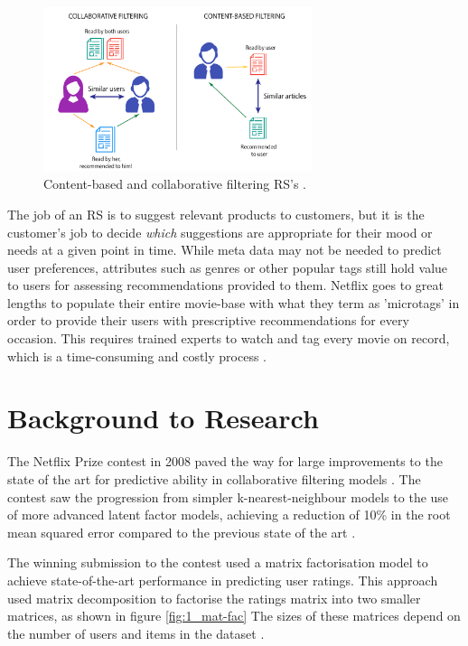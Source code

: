 \begin{figure}[H]
\centering
\includegraphics[width=0.7\textwidth]{Figures/1_content-based-vs-CF.png}
\decoRule
\caption[Types of recommender systems]{Content-based and collaborative filtering RS's \parencite{mohamed2019recommender}.}
\label{fig:1_content-cf}
\end{figure}

The job of an RS is to suggest relevant products to customers, but it is the customer's job to decide \textit{which} suggestions are appropriate for their mood or needs at a given point in time. While meta data may not be needed to predict user preferences, attributes such as genres or other popular tags still hold value to users for assessing recommendations provided to them. Netflix goes to great lengths to populate their entire movie-base with what they term as 'microtags' in order to provide their users with prescriptive recommendations for every occasion. This requires trained experts to watch and tag every movie on record, which is a time-consuming and costly process \parencite{atlantic2014genres}.

\section{Background to Research}
The Netflix Prize contest in 2008 paved the way for large improvements to the state of the art for predictive ability in collaborative filtering models \parencite{netflix_description}. The contest saw the progression from simpler k-nearest-neighbour models to the use of more advanced latent factor models, achieving a reduction of 10\% in the root mean squared error compared to the previous state of the art \parencite{netflix_bellkor}.

The winning submission to the contest used a matrix factorisation model to achieve state-of-the-art performance in predicting user ratings. This approach used matrix decomposition to factorise the ratings matrix into two smaller matrices, as shown in figure \ref{fig:1_mat-fac} The sizes of these matrices depend on the number of users and items in the dataset \parencite{netflix_bellkor}.

